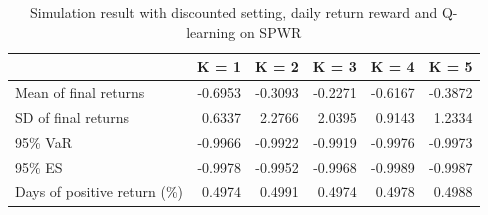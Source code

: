 \documentclass{article}
\begin{document}
\begin{table}[H]
\centering
\begin{tabular}{|l|r|r|r|r|r|} 
\hline
                             & \multicolumn{1}{l|}{K = 1} & \multicolumn{1}{l|}{K = 2} & \multicolumn{1}{l|}{K = 3} & \multicolumn{1}{l|}{K = 4} & \multicolumn{1}{l|}{K = 5}  \\ 
\hline
Mean of final returns        & -0.6953                    & -0.3093                    & -0.2271                    & -0.6167                    & -0.3872                     \\ 
\hline
SD of final returns          & 0.6337                     & 2.2766                     & 2.0395                     & 0.9143                     & 1.2334                      \\ 
\hline
95\% VaR                     & -0.9966                    & -0.9922                    & -0.9919                    & -0.9976                    & -0.9973                     \\ 
\hline
95\% ES                      & -0.9978                    & -0.9952                    & -0.9968                    & -0.9989                    & -0.9987                     \\ 
\hline
Days of positive return (\%) & 0.4974                     & 0.4991                     & 0.4974                     & 0.4978                     & 0.4988                      \\
\hline
\end{tabular}
\caption{Simulation result with discounted setting, daily return reward and Q-learning on SPWR}
\label{table10}
\end{table}
\end{document}
